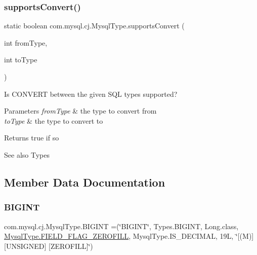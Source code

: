 \mbox{\label{enumcom_1_1mysql_1_1cj_1_1_mysql_type_a4b4c2fc4727e3e28c653e6cdfb2eaed5}} 
\subsubsection{\texorpdfstring{supports\+Convert()}{supportsConvert()}}
{\footnotesize\ttfamily static boolean com.\+mysql.\+cj.\+Mysql\+Type.\+supports\+Convert (\begin{DoxyParamCaption}\item[{int}]{from\+Type,  }\item[{int}]{to\+Type }\end{DoxyParamCaption})\hspace{0.3cm}{\ttfamily [static]}}

Is C\+O\+N\+V\+E\+RT between the given S\+QL types supported?


\begin{DoxyParams}{Parameters}
{\em from\+Type} & the type to convert from \\
\hline
{\em to\+Type} & the type to convert to \\
\hline
\end{DoxyParams}
\begin{DoxyReturn}{Returns}
true if so 
\end{DoxyReturn}
\begin{DoxySeeAlso}{See also}
Types 
\end{DoxySeeAlso}


\subsection{Member Data Documentation}
\mbox{\label{enumcom_1_1mysql_1_1cj_1_1_mysql_type_a5e0b78b90c1ad86e03b108c01d729118}} 
\subsubsection{\texorpdfstring{B\+I\+G\+I\+NT}{BIGINT}}
{\footnotesize\ttfamily com.\+mysql.\+cj.\+Mysql\+Type.\+B\+I\+G\+I\+NT =(\char`\"{}B\+I\+G\+I\+NT\char`\"{}, Types.\+B\+I\+G\+I\+NT, Long.\+class, \mbox{\hyperlink{enumcom_1_1mysql_1_1cj_1_1_mysql_type_abb76a1f2f3dac9a30d1b559b8ba66a48}{Mysql\+Type.\+F\+I\+E\+L\+D\+\_\+\+F\+L\+A\+G\+\_\+\+Z\+E\+R\+O\+F\+I\+LL}}, Mysql\+Type.\+I\+S\+\_\+\+D\+E\+C\+I\+M\+AL, 19\+L, \char`\"{}\mbox{[}(\+M)\mbox{]} \mbox{[}\+U\+N\+S\+I\+G\+N\+E\+D\mbox{]} \mbox{[}\+Z\+E\+R\+O\+F\+I\+L\+L\mbox{]}\char`\"{})}

